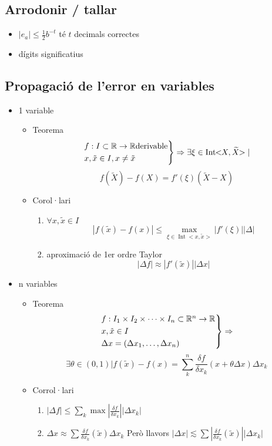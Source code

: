 \documentclass{article}
\newcommand{\R}{\mathbb{R}}
\DeclareMathOperator{\Int}{Int}
\begin{document}
\subsection{Arrodonir / tallar}
\begin{itemize}
\item $|e_a| \le \frac{1}{2} b^{-t}$ té $t$ decimals correctes
\item dígits significatius
\end{itemize}

\subsection{Propagació de l'error en variables}
\begin{itemize}
\item 1 variable
	\begin{itemize}
	\item Teorema
		$$
		\begin{rcases}
			f:I \subset \R \to \R \text{derivable}\\
			x, \tilde{x} \in I, x \neq \tilde{x}
		\end{rcases}
		\Rightarrow \exists \xi \in \Int\!\!<\!\!X, \widetilde{X}\!\!>
		|$$$$
		f(\widetilde{X}) - f(X) = f'(\xi) (\widetilde{X} - X)
 		$$
	\item Corol·lari
		\begin{enumerate}
		\item $\forall x, \widetilde{x} \in I$
			$$|f(\tilde{x}) - f(x)| \le \max_{\xi \in \Int\!\!<\!\!x,\tilde{x}\!\!>}|f'(\xi)||\Delta|$$
		\item aproximació de 1er ordre Taylor
			$$|\Delta f| \approx |f'(\tilde{x})||\Delta x|$$
		\end{enumerate}
	\end{itemize}
\item n variables
	\begin{itemize}
	\item Teorema
		$$
		\begin{rcases}
			f:I_1 \times I_2 \times \dots \times I_n \subset \R^n \to \R\\
			x, \tilde{x} \in I\\
			\Delta x = (\Delta x_1, \dots, \Delta x_n)
		\end{rcases} \Rightarrow
		$$
		$$
		\exists \theta \in (0, 1) | f(\tilde{x}) - f(x) =
		\sum^n_k \frac{\delta f}{\delta x_k} (x + \theta \Delta x)\Delta x_k
		$$
	\item Corrol·lari
		\begin{enumerate}
		\item $|\Delta f| \le \sum_k \max |\frac{\delta f}{\delta x_k}||\Delta x_k|$
		\item $\Delta x \approx \sum \frac{\delta f}{\delta x_k}(\tilde{x})\Delta x_k$
			\subitem Però llavors
			\subitem $|\Delta x| \lesssim \sum \left|\frac{\delta f}{\delta x_k}(\tilde{x})\right||\Delta x_k|$
		\end{enumerate}
	\end{itemize}
\end{itemize}
\end{document}
